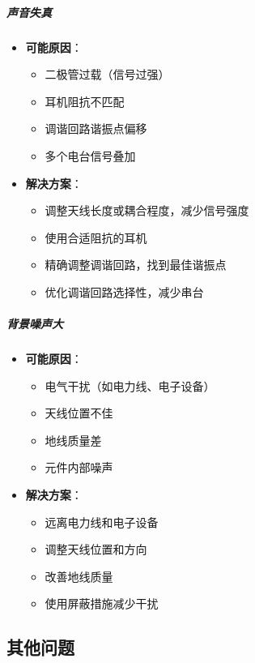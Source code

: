 \documentclass[12pt,UTF8]{ctexbook}
\begin{document}
\subparagraph{声音失真}

\begin{itemize}[leftmargin=3.5em]
    \item \textbf{可能原因}：
    \begin{itemize}
        \item 二极管过载（信号过强）
        \item 耳机阻抗不匹配
        \item 调谐回路谐振点偏移
        \item 多个电台信号叠加
    \end{itemize}
    \item \textbf{解决方案}：
    \begin{itemize}
        \item 调整天线长度或耦合程度，减少信号强度
        \item 使用合适阻抗的耳机
        \item 精确调整调谐回路，找到最佳谐振点
        \item 优化调谐回路选择性，减少串台
    \end{itemize}
\end{itemize}

\subparagraph{背景噪声大}

\begin{itemize}[leftmargin=3.5em]
    \item \textbf{可能原因}：
    \begin{itemize}
        \item 电气干扰（如电力线、电子设备）
        \item 天线位置不佳
        \item 地线质量差
        \item 元件内部噪声
    \end{itemize}
    \item \textbf{解决方案}：
    \begin{itemize}
        \item 远离电力线和电子设备
        \item 调整天线位置和方向
        \item 改善地线质量
        \item 使用屏蔽措施减少干扰
    \end{itemize}
\end{itemize}

\subsection{其他问题}
\end{document}
